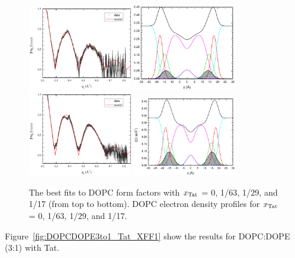 \begin{figure}[htbp]
  \includegraphics[width=0.4\textwidth]{figures/Tat/SDP_Results/XFF/DOPC_Tat_28to1_3p0_XFF1}
  \includegraphics[width=0.4\textwidth]{figures/Tat/SDP_Results/EDP/DOPC_Tat_28to1_3p0_EDP1}
  \includegraphics[width=0.4\textwidth]{figures/Tat/SDP_Results/XFF/DOPC_Tat_16to1_3p0_XFF1}
  \includegraphics[width=0.4\textwidth]{figures/Tat/SDP_Results/EDP/DOPC_Tat_16to1_3p0_EDP1}
  \caption{The best fits to DOPC form factors with $x_\textrm{Tat}$ = 0, 1/63, 1/29, 
  and 1/17 (from top to bottom). DOPC electron density profiles for $x_\textrm{Tat}$ = 0, 1/63,
  1/29, and 1/17.}
  \label{fig:DOPC_Tat_XFF1}
\end{figure}
Figure~\ref{fig:DOPCDOPE3to1_Tat_XFF1} show the results for DOPC:DOPE (3:1)
with Tat.
